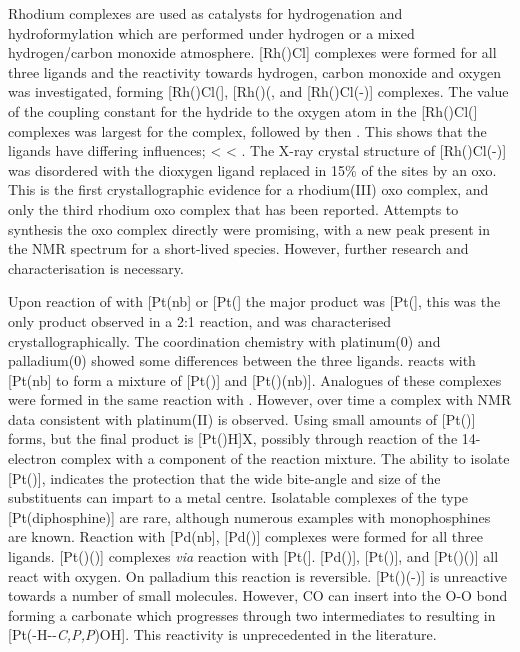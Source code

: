 Rhodium complexes are used as catalysts for hydrogenation and hydroformylation which are performed under hydrogen or a mixed hydrogen/carbon monoxide atmosphere.  [Rh(\tBuxantphosk)Cl] complexes were formed for all three \tBuxantphos{} ligands and the reactivity towards hydrogen, carbon monoxide and oxygen was investigated, forming [Rh(\tBuxantphosk)Cl(], [Rh(\tBuxantphos)(\ce{CO)2Cl]}, and [Rh(\tBuxantphosk)Cl(-)] complexes.  The value of the \JRhH{} coupling constant for the hydride \trans{} to the oxygen atom in the [Rh(\tBuxantphosk)Cl(] complexes was largest for the \tBusixantphos{} complex, followed by \tButhixantphos{} then \tBuxantphos{}.  This shows that the ligands have differing \trans{} influences; \tBuxantphos{} \textless{} \tButhixantphos{} \textless{} \tBusixantphos.  The X-ray crystal structure of [Rh(\tBuxantphosk)Cl(-)] was disordered with the dioxygen ligand replaced in 15\% of the sites by an oxo.  This is the first crystallographic evidence for a rhodium(III) oxo complex, and only the third rhodium oxo complex that has been reported.  Attempts to synthesis the oxo complex directly were promising, with a new peak present in the \phosphorus{} NMR spectrum for a short-lived species.  However, further research and characterisation is necessary.

Upon reaction of \Phthixantphos{} with [Pt(nb] or [Pt(] the major product was [Pt(\Phthixantphos{}], this was the only product observed in a 2:1 reaction, and was characterised crystallographically.  The coordination chemistry with platinum(0) and palladium(0) showed some differences between the three \tBuxantphos{} ligands.  \tBuThixantphos{} reacts with [Pt(nb] to form a mixture of [Pt(\tButhixantphos)] and [Pt(\tButhixantphos)(nb)].  Analogues of these complexes were formed in the same reaction with \tBusixantphos{}.  However, over time a complex with NMR data consistent with platinum(II) is observed.  Using \tBuxantphos{} small amounts of [Pt(\tBuxantphos)] forms, but the final product is [Pt(\tBuxantphos)H]X, possibly through reaction of the 14-electron complex with a component of the reaction mixture.  The ability to isolate [Pt(\tButhixantphos)], indicates the protection that the wide bite-angle and size of the \tBu{} substituents can impart to a metal centre.  Isolatable complexes of the type [Pt(diphosphine)] are rare, although numerous examples with monophosphines are known.  Reaction with [Pd(nb], [Pd(\tBuxantphos)] complexes were formed for all three ligands.  [Pt(\tBuxantphos)()] complexes \emph{via} reaction with [Pt(].  [Pd(\tButhixantphos)], [Pt(\tButhixantphos)], and [Pt(\tButhixantphos)()] all react with oxygen.  On palladium this reaction is reversible.  [Pt(\tButhixantphos)(-)] is unreactive towards a number of small molecules.  However, CO can insert into the O-O bond forming a carbonate which progresses through two intermediates to resulting in [Pt(\tButhixantphos-H-\dento{}-\emph{C,P,P}\textprime)OH].  This reactivity is unprecedented in the literature.  

